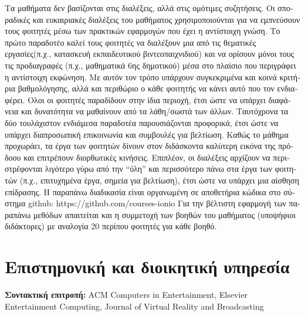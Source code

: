 \documentclass[11pt, a4paper]{article}
\begin{document}
\begin{greek}
Τα μαθήματα δεν βασίζονται στις διαλέξεις, αλλά στις ομότιμες
συζητήσεις. Οι σποραδικές και ευκαιριακές διαλέξεις του μαθήματος
χρησιμοποιούνται για να εμπνεύσουν τους φοιτητές μέσω των πρακτικών
εφαρμογών που έχει η αντίστοιχη γνώση. Το πρώτο παραδοτέο καλεί τους
φοιτητές να διαλέξουν μια από τις θεματικές εργασίες(π.χ., κατασκευή
εκπαιδευτικού βιντεοπαιχνιδιού) και να ορίσουν μόνοι τους τις
προδιαγραφές (π.χ., μαθηματικά 6ης δημοτικού) μέσα στο πλαίσιο που
περιγράφει η αντίστοιχη εκφώνηση. Με αυτόν τον τρόπο υπάρχουν
συγκεκριμένα και κοινά κριτήρια βαθμολόγησης, αλλά και περιθώριο ο κάθε
φοιτητής να κάνει αυτό που τον ενδιαφέρει. Ολοι οι φοιτητές παραδίδουν
στην ίδια περιοχή, έτσι ώστε να υπάρχει διαφάνεια και δυνατότητα να
μαθαίνουν από τα λάθη/σωστά των άλλων. Ταυτόχρονα τα δύο τουλάχιστον
ενδιάμεσα παραδοτέα παρουσιάζονται προφορικά, έτσι ώστε να υπάρχει
διαπροσωπική επικοινωνία και συμβουλές για βελτίωση. Καθώς το μάθημα
προχωράει, τα έργα των φοιτητών δίνουν στον διδάσκοντα καλύτερη εικόνα
της πρόδοου και επιτρέπουν διορθωτικές κινήσεις. Επιπλέον, οι διαλέξεις
αρχίζουν να περιστρέφονται λιγότερο γύρω από την ``ύλη'' και περισσότερο
πάνω στα έργα των φοιτητών (π.χ., επιτυχημένα έργα, σημεία για
βελτίωση), έτσι ώστε να υπάρχει μια αίσθηση επίδρασης. Η παραπάνω
διαδικασία είναι οργανωμένη σε αποθετήρια κώδικα στο σύστημα github:
https://github.com/courses-ionio Για την βέλτιστη εφαρμογή των παραπάνω
μεθόδων απαιτείται και η συμμετοχή των βοηθών του μαθήματος (υποψήφιοι
διδάκτορες) με αναλογία 20 περίπου φοιτητές για κάθε βοηθό.

\hypertarget{ux3b5ux3c0ux3b9ux3c3ux3c4ux3b7ux3bcux3bfux3bdux3b9ux3baux3ae-ux3baux3b1ux3b9-ux3b4ux3b9ux3bfux3b9ux3baux3b7ux3c4ux3b9ux3baux3ae-ux3c5ux3c0ux3b7ux3c1ux3b5ux3c3ux3afux3b1}{%
\section{Επιστημονική και διοικητική
υπηρεσία}\label{ux3b5ux3c0ux3b9ux3c3ux3c4ux3b7ux3bcux3bfux3bdux3b9ux3baux3ae-ux3baux3b1ux3b9-ux3b4ux3b9ux3bfux3b9ux3baux3b7ux3c4ux3b9ux3baux3ae-ux3c5ux3c0ux3b7ux3c1ux3b5ux3c3ux3afux3b1}}

\textbf{Συντακτική επιτροπή:} ACM Computers in Entertainment, Elsevier
Entertainment Computing, Journal of Virtual Reality and Broadcasting


\end{greek}
\end{document}
